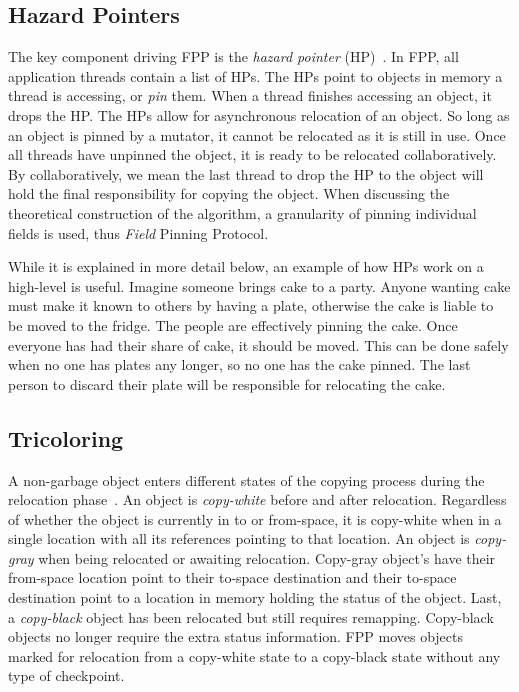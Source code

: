 \documentclass{sig-alternate}
\begin{document}
\subsection{Hazard Pointers}
\label{sec:fppHazard}

The key component driving FPP is the \emph{hazard pointer} (HP)~\cite{Osterlund:FPP}. 
In FPP, all application threads contain a list of HPs.
The HPs point to objects in memory a thread is accessing, or \emph{pin} them.
When a thread finishes accessing an object, it drops the HP.
The HPs allow for asynchronous relocation of an object. So long as an object
is pinned by a mutator, it cannot be relocated as it is still in use. Once all threads have
unpinned the object, it is ready to be relocated collaboratively.
By collaboratively, we mean the last thread to drop the HP to the object
will hold the final responsibility for copying the object.
When discussing the theoretical construction of the algorithm, a granularity of pinning 
individual fields is used, thus \emph{Field} Pinning Protocol. 

While it is explained in more detail below, an example of how HPs 
work on a high-level is useful. Imagine someone brings cake to a party. Anyone 
wanting cake must make it known to others by having a plate, otherwise the 
cake is liable to be moved to the fridge. The people are effectively pinning the cake.
Once everyone has had their share of cake, it should be moved. This can
be done safely when no one has plates any longer, so no one has the cake pinned.
The last person to discard their plate will be responsible for relocating the cake.


\subsection{Tricoloring}
\label{sec:fppColoring}

A non-garbage object enters different states of the copying process 
during the relocation phase~\cite{Osterlund:FPP}. An object is
\emph{copy-white} before and after relocation. Regardless of whether the object is
currently in to or from-space, it is copy-white when in a single location with all its
references pointing to that location. An object is \emph{copy-gray} when
being relocated or awaiting relocation. Copy-gray object's have their from-space location
point to their to-space destination and their to-space destination point to a location in
memory holding the status of the object. Last, a \emph{copy-black} object has
been relocated but still requires remapping. Copy-black objects no longer require the extra
status information. FPP moves objects marked for relocation from a copy-white state to
a copy-black state without any type of checkpoint.
\end{document}

